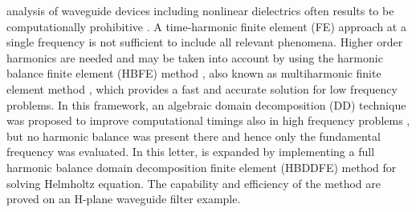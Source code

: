\documentclass[journal,twoside]{IEEEtran}
\begin{document}
 analysis of waveguide devices including nonlinear
dielectrics often results to be computationally prohibitive \cite{deGersem2001}.
A time-harmonic finite element (FE) approach at a single frequency is not 
sufficient to include all relevant phenomena. 
Higher order harmonics are needed and may be taken into account by using the 
harmonic balance finite element (HBFE) method \cite{Yamada1989}, also known as 
multiharmonic finite element method \cite{Copeland2010}, which provides a fast 
and accurate solution for low frequency problems.
In this framework, an algebraic domain decomposition (DD) technique was
proposed to improve computational timings also in high frequency
problems \cite{Guarnieri2010}, but no harmonic balance
was present there and hence only the fundamental frequency was evaluated.
In this letter, \cite{Guarnieri2010} is expanded by implementing a full
harmonic balance domain decomposition finite element (HBDDFE) method for
solving Helmholtz equation. The capability and efficiency of the method are
proved on an H-plane waveguide filter example.

\end{document}
